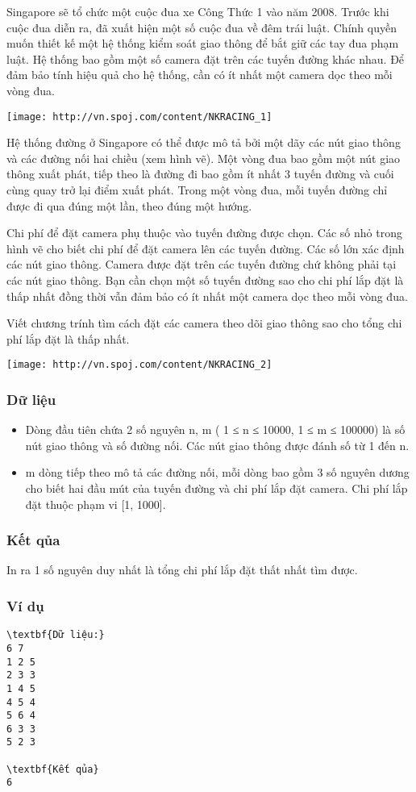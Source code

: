 



   Singapore sẽ tổ chức một cuộc đua xe Công Thức 1 vào năm 2008. Trước khi cuộc đua diễn ra, đã xuất hiện một số cuộc đua về đêm trái luật. Chính quyền muốn thiết kế một hệ thống kiểm soát giao   thông để bắt giữ các tay đua phạm luật. Hệ thống bao gồm một số camera đặt trên các tuyến đường khác nhau. Để đảm bảo tính hiệu quả cho hệ thống, cần có ít nhất một camera dọc theo mỗi vòng đua.  


\texttt{[image: http://vn.spoj.com/content/NKRACING\_1]}

   Hệ thống đường ở Singapore có thể được mô tả bởi một dãy các nút giao thông và các đường nối hai chiều (xem hình vẽ). Một vòng đua bao gồm một nút giao thông xuất phát, tiếp theo là đường đi bao   gồm ít nhất 3 tuyến đường và cuối cùng quay trở lại điểm xuất phát. Trong một vòng đua, mỗi tuyến đường chỉ được đi qua đúng một lần, theo đúng một hướng.  

   Chi phí để đặt camera phụ thuộc vào tuyến đường được chọn. Các số nhỏ trong hình vẽ cho biết chi phí để đặt camera lên các tuyến đường. Các số lớn xác định các nút giao thông. Camera được đặt trên   các tuyến đường chứ không phải tại các nút giao thông. Bạn cần chọn một số tuyến đường sao cho chi phí lắp đặt là thấp nhất đồng thời vẫn đảm bảo có ít nhất một camera dọc theo mỗi vòng đua.  

   Viết chương trính tìm cách đặt các camera theo dõi giao thông sao cho tổng chi phí lắp đặt là thấp nhất.  


\texttt{[image: http://vn.spoj.com/content/NKRACING\_2]}

\subsubsection{   Dữ liệu  }
\begin{itemize}
	\item     Dòng đầu tiên chứa 2 số nguyên n, m ( 1 ≤ n ≤ 10000, 1 ≤ m ≤ 100000)  là số nút giao thông và số đường nối. Các nút giao thông được đánh số từ 1 đến n.   
	\item     m dòng tiếp theo mô tả các đường nối, mỗi dòng bao gồm 3 số nguyên dương cho biết hai đầu mút của tuyến đường và chi phí lắp đặt camera. Chi phí lắp đặt thuộc phạm vi [1, 1000].   
\end{itemize}

\subsubsection{   Kết qủa  }

   In ra 1 số nguyên duy nhất là tổng chi phí lắp đặt thất nhất tìm được.  

\subsubsection{   Ví dụ  }
\begin{verbatim}
\textbf{Dữ liệu:}
6 7
1 2 5
2 3 3
1 4 5
4 5 4
5 6 4
6 3 3
5 2 3

\textbf{Kết qủa}
6
\end{verbatim}